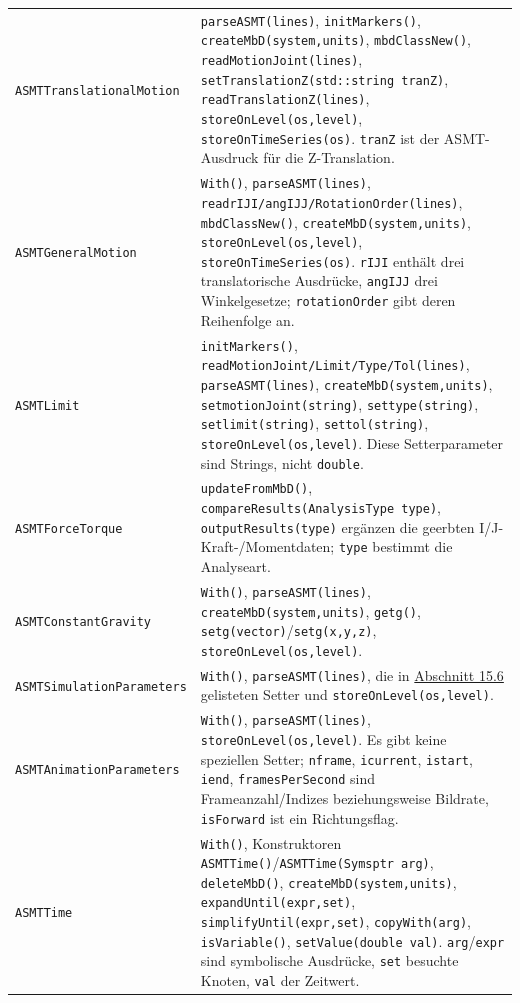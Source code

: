 \documentclass[
  12pt
]{book}
\begin{document}
\begin{longtable}[]{@{}
  >{\raggedright\arraybackslash}p{}
  >{\raggedright\arraybackslash}p{}@{}}
\texttt{ASMTTranslationalMotion} & \texttt{parseASMT(lines)},
\texttt{initMarkers()}, \texttt{createMbD(system,units)},
\texttt{mbdClassNew()}, \texttt{readMotionJoint(lines)},
\texttt{setTranslationZ(std::string\ tranZ)},
\texttt{readTranslationZ(lines)}, \texttt{storeOnLevel(os,level)},
\texttt{storeOnTimeSeries(os)}. \texttt{tranZ} ist der ASMT-Ausdruck für
die Z-Translation. \\
\texttt{ASMTGeneralMotion} & \texttt{With()}, \texttt{parseASMT(lines)},
\texttt{readrIJI/angIJJ/RotationOrder(lines)}, \texttt{mbdClassNew()},
\texttt{createMbD(system,units)}, \texttt{storeOnLevel(os,level)},
\texttt{storeOnTimeSeries(os)}. \texttt{rIJI} enthält drei
translatorische Ausdrücke, \texttt{angIJJ} drei Winkelgesetze;
\texttt{rotationOrder} gibt deren Reihenfolge an. \\
\texttt{ASMTLimit} & \texttt{initMarkers()},
\texttt{readMotionJoint/Limit/Type/Tol(lines)},
\texttt{parseASMT(lines)}, \texttt{createMbD(system,units)},
\texttt{setmotionJoint(string)}, \texttt{settype(string)},
\texttt{setlimit(string)}, \texttt{settol(string)},
\texttt{storeOnLevel(os,level)}. Diese Setterparameter sind Strings,
nicht \texttt{double}. \\
\texttt{ASMTForceTorque} & \texttt{updateFromMbD()},
\texttt{compareResults(AnalysisType\ type)},
\texttt{outputResults(type)} ergänzen die geerbten
I/J-Kraft-/Momentdaten; \texttt{type} bestimmt die Analyseart. \\
\texttt{ASMTConstantGravity} & \texttt{With()},
\texttt{parseASMT(lines)}, \texttt{createMbD(system,units)},
\texttt{getg()}, \texttt{setg(vector)}/\texttt{setg(x,y,z)},
\texttt{storeOnLevel(os,level)}. \\
\texttt{ASMTSimulationParameters} & \texttt{With()},
\texttt{parseASMT(lines)}, die in
\protect\hyperlink{abs-api-motion-limits-lasten}{Abschnitt 15.6}
gelisteten Setter und \texttt{storeOnLevel(os,level)}. \\
\texttt{ASMTAnimationParameters} & \texttt{With()},
\texttt{parseASMT(lines)}, \texttt{storeOnLevel(os,level)}. Es gibt
keine speziellen Setter; \texttt{nframe}, \texttt{icurrent},
\texttt{istart}, \texttt{iend}, \texttt{framesPerSecond} sind
Frameanzahl/Indizes beziehungsweise Bildrate, \texttt{isForward} ist ein
Richtungsflag. \\
\texttt{ASMTTime} & \texttt{With()}, Konstruktoren
\texttt{ASMTTime()}/\texttt{ASMTTime(Symsptr\ arg)},
\texttt{deleteMbD()}, \texttt{createMbD(system,units)},
\texttt{expandUntil(expr,set)}, \texttt{simplifyUntil(expr,set)},
\texttt{copyWith(arg)}, \texttt{isVariable()},
\texttt{setValue(double\ val)}. \texttt{arg}/\texttt{expr} sind
symbolische Ausdrücke, \texttt{set} besuchte Knoten, \texttt{val} der
Zeitwert. \\
\end{longtable}
\end{document}
